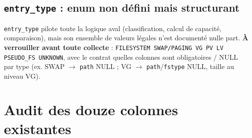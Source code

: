 \documentclass[11pt,a4paper]{article}
\newcommand{\code}[1]{\texttt{#1}}
\begin{document}
\subsection{\code{entry\_type} : enum non d\'efini mais structurant}

\code{entry\_type} pilote toute la logique aval (classification, calcul de capacit\'e, comparaison),
mais son ensemble de valeurs l\'egales n'est document\'e nulle part. \textbf{\`A verrouiller avant
toute collecte} : \code{FILESYSTEM \textbar{} SWAP/PAGING \textbar{} VG \textbar{} PV \textbar{} LV
\textbar{} PSEUDO\_FS \textbar{} UNKNOWN}, avec le contrat \og quelles colonnes sont obligatoires /
NULL par type\fg{} (ex. SWAP $\rightarrow$ \code{path} NULL ; VG $\rightarrow$ \code{path}/\code{fstype}
NULL, taille au niveau VG).

\section{Audit des douze colonnes existantes}
\end{document}
